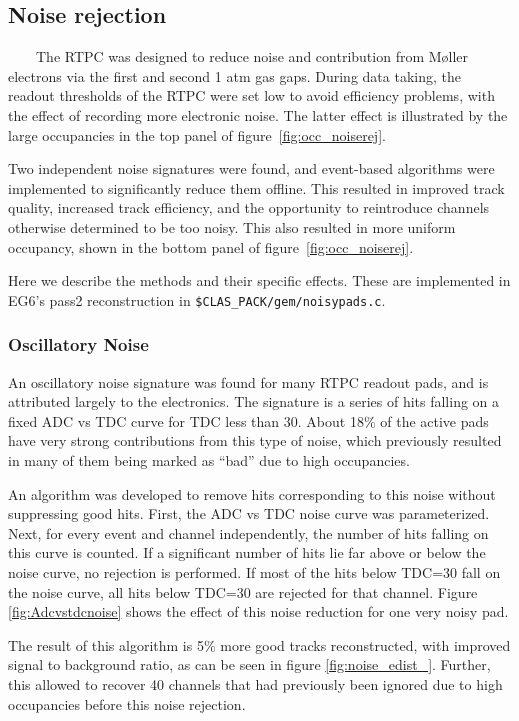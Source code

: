 \subsection{Noise rejection}
\label{sec:noise_rejection}
~~~~The RTPC was designed to reduce noise and contribution from M\o ller 
electrons via the first and second 1 atm gas gaps. During data taking, the 
readout thresholds of the RTPC were set low to avoid efficiency problems, with 
the effect of recording more electronic noise. The latter effect is illustrated 
by the large occupancies in the top panel of 
figure~\ref{fig:occ_noiserej}.  

Two independent noise signatures were found, and event-based algorithms were implemented to significantly reduce them offline. This resulted in improved track quality, increased track efficiency, and the opportunity to reintroduce channels otherwise determined to be too noisy.  This also resulted in more uniform occupancy, shown in the bottom panel of figure~\ref{fig:occ_noiserej}.  

Here we describe the methods and their specific effects. These are implemented 
in EG6's pass2 reconstruction in \texttt{\$CLAS\_PACK/gem/noisypads.c}.

\subsubsection{Oscillatory Noise}
An oscillatory noise signature was found for many RTPC readout pads, and is 
attributed largely to the electronics. The signature is a series of hits 
falling on a fixed ADC vs TDC curve for TDC less than 30.  About 18\% of the 
active pads have very strong contributions from this type of noise, which 
previously resulted in many of them being marked as ``bad'' due to high 
occupancies.

An algorithm was developed to remove hits corresponding to this noise without suppressing good hits.  First, the ADC vs TDC noise curve was parameterized.  Next, for every event and channel independently, the number of hits falling on this curve is counted.  If a significant number of hits lie far above or below the noise curve, no rejection is performed.  If most of the hits below TDC=30 fall on the noise curve, all hits below TDC=30 are rejected for that channel.  Figure \ref{fig:Adcvstdcnoise} shows the effect of this noise reduction for one very noisy pad.

The result of this algorithm is 5$\%$ more good tracks reconstructed, with improved signal to background ratio, as can be seen in figure \ref{fig:noise_edist_}. 
Further, this allowed to recover 40 channels that had previously been ignored due to high occupancies before this noise rejection.

